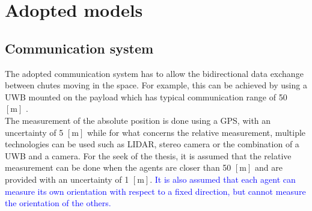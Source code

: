 \section{Adopted models}
\subsection{Communication system}\label{communication}
The adopted communication system has to allow the bidirectional data exchange between chutes moving in the space. For example, this can be achieved by using a UWB mounted on the payload which has typical communication range of 50 $\left[\si{\meter}\right]$ \cite{b11}.\\
The measurement of the absolute position is done using a GPS, with an uncertainty of 5 $\left[\si{\meter}\right]$ while for what concerns the relative measurement, multiple technologies can be used such as LIDAR, stereo camera or the combination of a UWB and a camera. For the seek of the thesis, it is assumed that the relative measurement can be done when the agents are closer than 50 $\left[\si{\meter}\right]$ and are provided with an uncertainty of 1 $\left[\si{\meter}\right]$. \textcolor{blue}{It is also assumed that each agent can measure its own orientation with respect to a fixed direction, but cannot measure the orientation of the others.}

